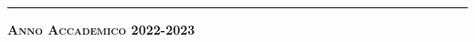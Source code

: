 \begin{titlepage}
\begin{center}
\begin{tabular}{lcl}
\end{tabular}

\vspace{12mm}

\rule{150mm}{.2mm}

\textbf{\scshape Anno Accademico 2022-2023}
\end{center} 	
\end{titlepage}


